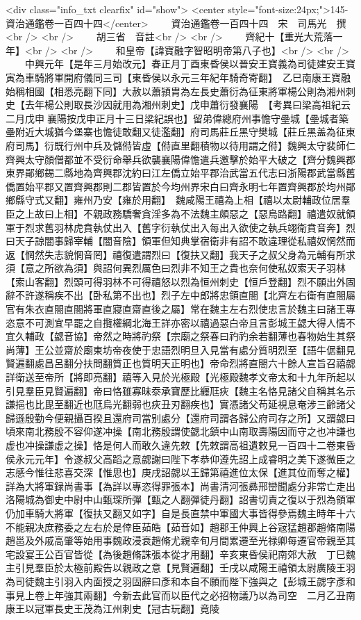 <div class="info_txt clearfix" id="show">
<center style="font-size:24px;">145-資治通鑑卷一百四十四</center>
  　　資治通鑑卷一百四十四　宋　司馬光　撰<br />
<br />
　　胡三省　音註<br />
<br />
　　齊紀十【重光大荒落一年】<br />
<br />
　　和皇帝【諱寶融字智昭明帝第八子也】<br />
<br />
　　中興元年【是年三月始改元】春正月丁酉東昏侯以晉安王寶義為司徒建安王寶寅為車騎將軍開府儀同三司【東昏侯以永元三年紀年騎奇寄翻】　乙巳南康王寶融始稱相國【相悉亮翻下同】大赦以蕭頴胄為左長史蕭衍為征東將軍楊公則為湘州刺史【去年楊公則取長沙因就用為湘州刺史】戊申蕭衍發襄陽　【考異曰梁高祖紀云二月戊申襄陽按戊申正月十三日梁紀誤也】留弟偉總府州事憺守壘城【壘城者築壘附近大城猶今堡寨也憺徒敢翻又徒濫翻】府司馬莊丘黑守樊城【莊丘黑盖為征東府司馬】衍既行州中兵及儲偫皆虛【偫直里翻積物以待用謂之偫】魏興太守裴師仁齊興太守顏僧都並不受衍命舉兵欲襲襄陽偉憺遣兵邀擊於始平大破之【齊分魏興郡東界鄖鄉錫二縣地為齊興郡沈約曰江左僑立始平郡治武當五代志曰浙陽郡武當縣舊僑置始平郡又置齊興郡則二郡皆置於今均州界宋白曰齊永明七年置齊興郡於均州鄖鄉縣守式又翻】雍州乃安【雍於用翻】　魏咸陽王禧為上相【禧以太尉輔政位居羣臣之上故曰上相】不親政務驕奢貪淫多為不法魏主頗惡之【惡烏路翻】禧遣奴就領軍于烈求舊羽林虎賁執仗出入【舊字衍執仗出入每出入欲使之執兵翊衛賁音奔】烈曰天子諒闇事歸宰輔【闇音陰】領軍但知典掌宿衛非有詔不敢違理從私禧奴惘然而返【惘然失志貌惘音罔】禧復遣謂烈曰【復扶又翻】我天子之叔父身為元輔有所求須【意之所欲為須】與詔何異烈厲色曰烈非不知王之貴也奈何使私奴索天子羽林【索山客翻】烈頭可得羽林不可得禧怒以烈為恒州刺史【恒戶登翻】烈不願出外固辭不許遂稱疾不出【卧私第不出也】烈子左中郎將忠領直閤【北齊左右衛有直閤屬官有朱衣直閤直閤將軍直寢直齋直後之屬】常在魏主左右烈使忠言於魏主曰諸王專恣意不可測宜早罷之自攬權綱北海王詳亦密以禧過惡白帝且言彭城王勰大得人情不宜久輔政【勰音協】帝然之時將礿祭【宗廟之祭春曰礿礿余若翻薄也春物始生其祭尚薄】王公並齋於廟東坊帝夜使于忠語烈明旦入見當有處分質明烈至【語牛倨翻見賢遍翻處昌呂翻分扶問翻質正也質明天正明也】帝命烈將直閤六十餘人宣旨召禧勰詳衛送至帝所【將即亮翻】禧等入見於光極殿【光極殿魏孝文帝太和十九年所起以引見羣臣見賢遍翻】帝曰恪雖寡昧沗承寶歷比纒尫疢【魏主名恪見諸父自稱其名示謙挹也比毘至翻近也尫烏光翻弱也疢丑刃翻疾也】實憑諸父苟延視息奄涉三齡諸父歸遜殷勤今便親攝百揆且還府司當别處分【還府司謂各歸公府司存之所】又謂勰曰頃來南北務殷不容仰遂冲操【南北務殷謂使勰北鎮中山南取壽陽因而守之也冲謙也虚也冲操謙虚之操】恪是何人而敢久違先敕【先敕謂高祖遺敕見一百四十二卷東昏侯永元元年】令遂叔父高蹈之意勰謝曰陛下孝恭仰遵先詔上成睿明之美下遂微臣之志感今惟往悲喜交深【惟思也】庚戌詔勰以王歸第禧進位太保【進其位而奪之權】詳為大將軍録尚書事【為詳以專恣得罪張本】尚書清河張彞邢巒聞處分非常亡走出洛陽城為御史中尉中山甄琛所彈【甄之人翻彈徒丹翻】詔書切責之復以于烈為領軍仍加車騎大將軍【復扶又翻又如字】自是長直禁中軍國大事皆得參焉魏主時年十六不能親决庶務委之左右於是倖臣茹皓【茹音如】趙郡王仲興上谷宼猛趙郡趙脩南陽趙邕及外戚高肇等始用事魏政浸衰趙脩尤親幸旬月間累遷至光禄卿每遷官帝親至其宅設宴王公百官皆從【為後趙脩誅張本從才用翻】辛亥東昏侯祀南郊大赦　丁巳魏主引見羣臣於太極前殿告以親政之意【見賢遍翻】壬戌以咸陽王禧領太尉廣陵王羽為司徒魏主引羽入内面授之羽固辭曰彥和本自不願而陛下強與之【彭城王勰字彥和事見上卷上年強其兩翻】今新去此官而以臣代之必招物議乃以為司空　二月乙丑南康王以冠軍長史王茂為江州刺史【冠古玩翻】竟陵